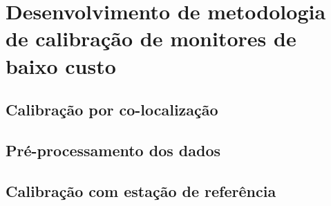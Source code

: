 \chapter{Desenvolvimento de metodologia de calibração de monitores de baixo custo}\label{cap:field-monit-results}

\section{Calibração por co-localização}

\section{Pré-processamento dos dados}



\section{Calibração com estação de referência}

